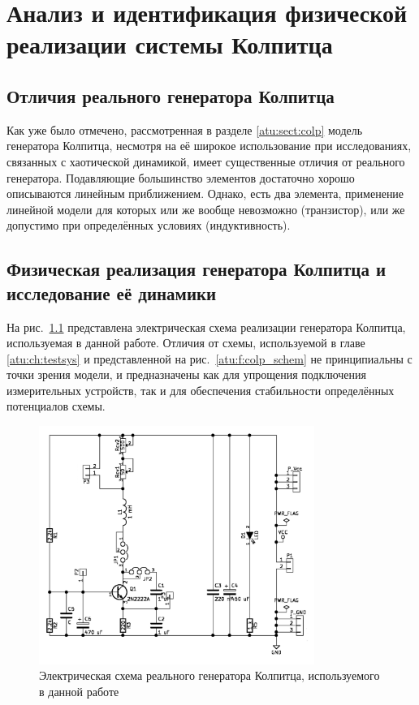 \chapter{Анализ и идентификация физической реализации системы Колпитца}
\label{atu:ch:colpreal}

\section{Отличия реального генератора Колпитца}


Как уже было отмечено,
рассмотренная в разделе \ref{atu:sect:colp} модель
генератора Колпитца, несмотря на её широкое использование
при исследованиях, связанных с хаотической динамикой,
имеет существенные отличия от реального генератора.
Подавляющие большинство элементов достаточно хорошо описываются линейным
приближением. Однако, есть два элемента,
применение линейной модели для которых или же вообще невозможно (транзистор),
или же допустимо при определённых условиях (индуктивность).





\section{Физическая реализация генератора Колпитца и исследование её динамики}

На рис.~\ref{atu:f:colp_schem_real} представлена электрическая схема
реализации генератора Колпитца, используемая в данной работе.
Отличия от схемы, используемой в главе \ref{atu:ch:testsys}
и представленной на рис.~\ref{atu:f:colp_schem}
не принципиальны с точки зрения модели,
и предназначены как для упрощения подключения
измерительных устройств, так и для
обеспечения стабильности определённых потенциалов схемы.

\begin{figure}[htb!]
\centerline{\includegraphics[width=0.8\textwidth]{p/colp_schem_real.png} }
\caption{Электрическая схема реального генератора Колпитца, используемого в данной работе}
\label{atu:f:colp_schem_real}
\end{figure}

